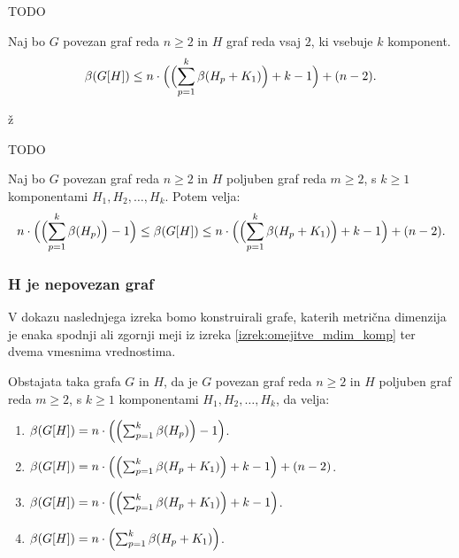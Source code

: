 \documentclass[mat1, tisk]{fmfdelo}
\newcommand{\1}{(1, 1, \ldots, 1)}
\newcommand{\2}{(2, 2, \ldots, 2)}
\begin{document}
\begin{dokaz}
    TODO
\end{dokaz}

\begin{trditev} \label{trditev:zgornja_meja_mdim_leksp}
    Naj bo $G$ povezan graf reda $n \geq 2$ in $H$ graf reda vsaj $2$, ki vsebuje $k$ komponent.
    $$\beta(G[H]) \leq 
    n \cdot \Bigl ( \Bigl ( \sum_{p=1}^{k} \beta(H_p + K_1) \Bigr ) + k - 1  \Bigr ) + (n-2). $$
\end{trditev}ž

\begin{dokaz}
    TODO
\end{dokaz}

\begin{izrek} \label{izrek:omejitve_mdim_komp}
    Naj bo $G$ povezan graf reda $n \geq 2$ in $H$ poljuben graf reda $m \geq 2$, s $k \geq 1$ 
    komponentami $H_1, H_2, \ldots , H_k$. Potem velja:
    $$
    n \cdot \Bigl ( \Bigl ( \sum_{p=1}^{k} \beta(H_p) \Bigr )  - 1  \Bigr ) 
    \leq \beta(G[H]) \leq 
    n \cdot \Bigl ( \Bigl ( \sum_{p=1}^{k} \beta(H_p + K_1) \Bigr ) + k - 1  \Bigr ) + (n-2). 
    $$
\end{izrek}
\begin{dokaz}

\end{dokaz}




\subsubsection{H je nepovezan graf} \label{sss:nepovezan}

V dokazu naslednjega izreka bomo konstruirali grafe, katerih metrična dimenzija je enaka
spodnji ali zgornji meji iz izreka \ref{izrek:omejitve_mdim_komp} ter dvema vmesnima vrednostima.
    
\begin{izrek} \label{izrek:primeri_mdim_komp}
Obstajata taka grafa $G$ in $H$, da je $G$ povezan graf reda $n \geq 2$ in $H$ poljuben graf 
reda $m \geq 2$, s $k \geq 1$ komponentami $H_1, H_2, \dots , H_k$, da velja:
    \begin{enumerate}
        \item $\beta(G[H]) = n \cdot \Bigl ( \Bigl ( \sum_{p=1}^{k} \beta(H_p) \Bigr )  - 1  \Bigr )$.
        \item $\beta(G[H]) = n \cdot \Bigl ( \Bigl ( \sum_{p=1}^{k} \beta(H_p + K_1) \Bigr ) + k - 1 
        \Bigr ) + (n-2)$.
        \item $\beta(G[H]) = n \cdot \Bigl ( \Bigl ( \sum_{p=1}^{k} \beta(H_p + K_1) \Bigr ) + k - 1  
        \Bigr )$.
        \item $\beta(G[H]) = n \cdot \Bigl ( \sum_{p=1}^{k} \beta(H_p + K_1) \Bigr ) $.
    \end{enumerate}
\end{izrek}
    
\end{document}
